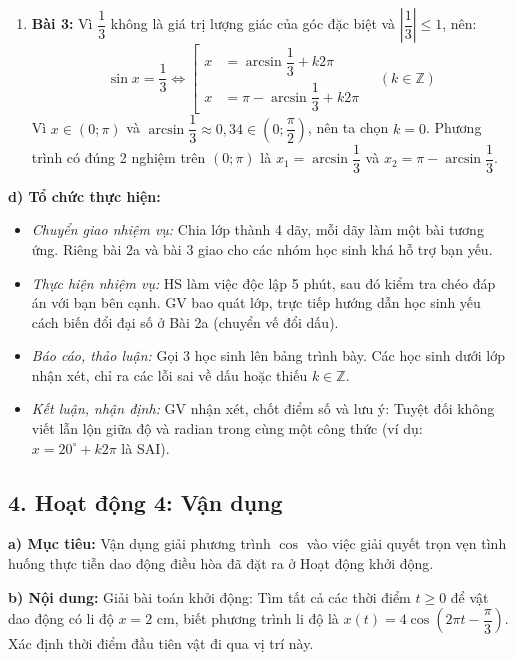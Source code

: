 \documentclass[12pt, a4paper]{article}
\begin{document}
\begin{enumerate}[leftmargin=0.6cm]
    \item \textbf{Bài 3:} Vì $\dfrac{1}{3}$ không là giá trị lượng giác của góc đặc biệt và $\left|\dfrac{1}{3}\right| \le 1$, nên:  
    $$\sin x = \dfrac{1}{3} \iff \left[\begin{aligned} x &= \arcsin\dfrac{1}{3} + k2\pi \\ x &= \pi - \arcsin\dfrac{1}{3} + k2\pi \end{aligned}\right. \quad (k \in \mathbb{Z})$$  
    Vì $x \in (0; \pi)$ và $\arcsin\dfrac{1}{3} \approx 0{,}34 \in \left(0; \dfrac{\pi}{2}\right)$, nên ta chọn $k = 0$. Phương trình có đúng 2 nghiệm trên $(0; \pi)$ là $x_1 = \arcsin\dfrac{1}{3}$ và $x_2 = \pi - \arcsin\dfrac{1}{3}$.  
\end{enumerate}  
  
\noindent \textbf{d) Tổ chức thực hiện:}  
\begin{itemize}[leftmargin=0.8cm]  
    \item \textit{Chuyển giao nhiệm vụ:} Chia lớp thành 4 dãy, mỗi dãy làm một bài tương ứng. Riêng bài 2a và bài 3 giao cho các nhóm học sinh khá hỗ trợ bạn yếu.  
    \item \textit{Thực hiện nhiệm vụ:} HS làm việc độc lập 5 phút, sau đó kiểm tra chéo đáp án với bạn bên cạnh. GV bao quát lớp, trực tiếp hướng dẫn học sinh yếu cách biến đổi đại số ở Bài 2a (chuyển vế đổi dấu).  
    \item \textit{Báo cáo, thảo luận:} Gọi 3 học sinh lên bảng trình bày. Các học sinh dưới lớp nhận xét, chỉ ra các lỗi sai về dấu hoặc thiếu $k \in \mathbb{Z}$.  
    \item \textit{Kết luận, nhận định:} GV nhận xét, chốt điểm số và lưu ý: Tuyệt đối không viết lẫn lộn giữa độ và radian trong cùng một công thức (ví dụ: $x = 20^\circ + k2\pi$ là SAI).  
\end{itemize}  
  
\subsection*{4. Hoạt động 4: Vận dụng}  
  
\noindent \textbf{a) Mục tiêu:}  
Vận dụng giải phương trình $\cos$ vào việc giải quyết trọn vẹn tình huống thực tiễn dao động điều hòa đã đặt ra ở Hoạt động khởi động.  
  
\noindent \textbf{b) Nội dung:}  
Giải bài toán khởi động: Tìm tất cả các thời điểm $t \ge 0$ để vật dao động có li độ $x = 2\text{ cm}$, biết phương trình li độ là $x(t) = 4\cos\left(2\pi t - \dfrac{\pi}{3}\right)$. Xác định thời điểm đầu tiên vật đi qua vị trí này.  
  
\end{document}
